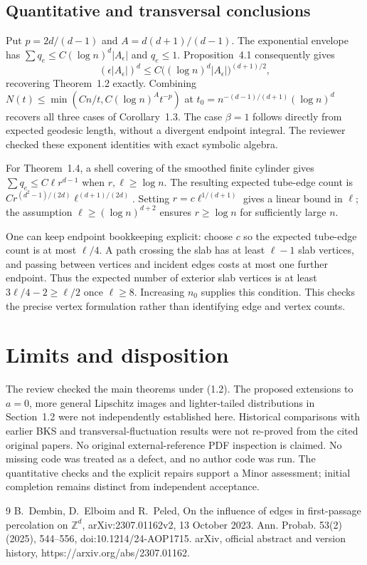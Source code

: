 \documentclass[10pt]{article}
\begin{document}
\subsection*{Quantitative and transversal conclusions}
Put \(p=2d/(d-1)\) and \(A=d(d+1)/(d-1)\). The exponential envelope has \(\sum q_e\leq C(\log n)^d|A_\epsilon|\) and \(q_e\leq1\). Proposition 4.1 consequently gives \[(\epsilon|A_\epsilon|)^d
   \leq C\big((\log n)^d|A_\epsilon|\big)^{(d+1)/2},\] recovering Theorem 1.2 exactly. Combining \(N(t)\leq\min(Cn/t,C(\log n)^At^{-p})\) at \(t_0=n^{-(d-1)/(d+1)}(\log n)^d\) recovers all three cases of Corollary 1.3. The case \(\beta=1\) follows directly from expected geodesic length, without a divergent endpoint integral. The reviewer checked these exponent identities with exact symbolic algebra.\par
For Theorem 1.4, a shell covering of the smoothed finite cylinder gives \(\sum q_e\leq C\ell r^{d-1}\) when \(r,\ell\geq\log n\). The resulting expected tube-edge count is \(Cr^{(d^2-1)/(2d)}\ell^{(d+1)/(2d)}\). Setting \(r=c\ell^{1/(d+1)}\) gives a linear bound in \(\ell\); the assumption \(\ell\geq(\log n)^{d+2}\) ensures \(r\geq\log n\) for sufficiently large \(n\).\par
One can keep endpoint bookkeeping explicit: choose \(c\) so the expected tube-edge count is at most \(\ell/4\). A path crossing the slab has at least \(\ell-1\) slab vertices, and passing between vertices and incident edges costs at most one further endpoint. Thus the expected number of exterior slab vertices is at least \(3\ell/4-2\geq\ell/2\) once \(\ell\geq8\). Increasing \(n_0\) supplies this condition. This checks the precise vertex formulation rather than identifying edge and vertex counts.\par
\section*{Limits and disposition}
The review checked the main theorems under (1.2). The proposed extensions to \(a=0\), more general Lipschitz images and lighter-tailed distributions in Section 1.2 were not independently established here. Historical comparisons with earlier BKS and transversal-fluctuation results were not re-proved from the cited original papers. No original external-reference PDF inspection is claimed. No missing code was treated as a defect, and no author code was run. The quantitative checks and the explicit repairs support a Minor assessment; initial completion remains distinct from independent acceptance.\par
9 B. Dembin, D. Elboim and R. Peled, On the influence of edges in first-passage percolation on \(\mathbb Z^d\), arXiv:2307.01162v2, 13 October 2023. Ann. Probab. 53(2) (2025), 544–556, doi:10.1214/24-AOP1715. arXiv, official abstract and version history, https://arxiv.org/abs/2307.01162.\par
\end{document}
